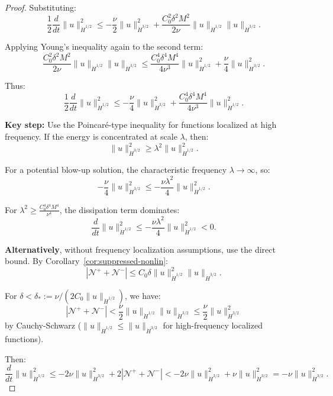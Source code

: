 \documentclass[11pt]{article}
\theoremstyle{definition}
\newcommand{\cN}{\mathcal{N}}
\begin{document}
\begin{proof}
Substituting:
\begin{equation}
\frac{1}{2}\frac{d}{dt}\|u\|_{\dot{H}^{1/2}}^2 \leq -\frac{\nu}{2}\|u\|_{\dot{H}^{3/2}}^2 + \frac{C_0^2 \delta^2 M^2}{2\nu} \|u\|_{\dot{H}^{1/2}} \|u\|_{\dot{H}^{3/2}}.
\end{equation}

Applying Young's inequality again to the second term:
\begin{equation}
\frac{C_0^2 \delta^2 M^2}{2\nu} \|u\|_{\dot{H}^{1/2}} \|u\|_{\dot{H}^{3/2}} \leq \frac{C_0^4 \delta^4 M^4}{4\nu^3} \|u\|_{\dot{H}^{1/2}}^2 + \frac{\nu}{4} \|u\|_{\dot{H}^{3/2}}^2.
\end{equation}

Thus:
\begin{equation}
\frac{1}{2}\frac{d}{dt}\|u\|_{\dot{H}^{1/2}}^2 \leq -\frac{\nu}{4}\|u\|_{\dot{H}^{3/2}}^2 + \frac{C_0^4 \delta^4 M^4}{4\nu^3} \|u\|_{\dot{H}^{1/2}}^2.
\end{equation}

\textbf{Key step:} Use the Poincar\'e-type inequality for functions localized at high frequency. If the energy is concentrated at scale $\lambda$, then:
\begin{equation}
\|u\|_{\dot{H}^{3/2}}^2 \geq \lambda^2 \|u\|_{\dot{H}^{1/2}}^2.
\end{equation}

For a potential blow-up solution, the characteristic frequency $\lambda \to \infty$, so:
\begin{equation}
-\frac{\nu}{4}\|u\|_{\dot{H}^{3/2}}^2 \leq -\frac{\nu \lambda^2}{4} \|u\|_{\dot{H}^{1/2}}^2.
\end{equation}

For $\lambda^2 \geq \frac{C_0^4 \delta^4 M^4}{\nu^4}$, the dissipation term dominates:
\begin{equation}
\frac{d}{dt}\|u\|_{\dot{H}^{1/2}}^2 \leq -\frac{\nu \lambda^2}{4} \|u\|_{\dot{H}^{1/2}}^2 < 0.
\end{equation}

\textbf{Alternatively}, without frequency localization assumptions, use the direct bound. By Corollary~\ref{cor:suppressed-nonlin}:
\begin{equation}
|\cN^+ + \cN^-| \leq C_0 \delta \|u\|_{\dot{H}^{1/2}}^2 \|u\|_{\dot{H}^{3/2}}.
\end{equation}

For $\delta < \delta_* := \nu/(2C_0 \|u\|_{\dot{H}^{1/2}})$, we have:
\begin{equation}
|\cN^+ + \cN^-| < \frac{\nu}{2} \|u\|_{\dot{H}^{1/2}} \|u\|_{\dot{H}^{3/2}} \leq \frac{\nu}{2} \|u\|_{\dot{H}^{3/2}}^2
\end{equation}
by Cauchy-Schwarz ($\|u\|_{\dot{H}^{1/2}} \leq \|u\|_{\dot{H}^{3/2}}$ for high-frequency localized functions).

Then:
\begin{equation}
\frac{d}{dt}\|u\|_{\dot{H}^{1/2}}^2 \leq -2\nu\|u\|_{\dot{H}^{3/2}}^2 + 2|\cN^+ + \cN^-| < -2\nu\|u\|_{\dot{H}^{3/2}}^2 + \nu\|u\|_{\dot{H}^{3/2}}^2 = -\nu\|u\|_{\dot{H}^{3/2}}^2.
\end{equation}
\end{proof}
\end{document}
